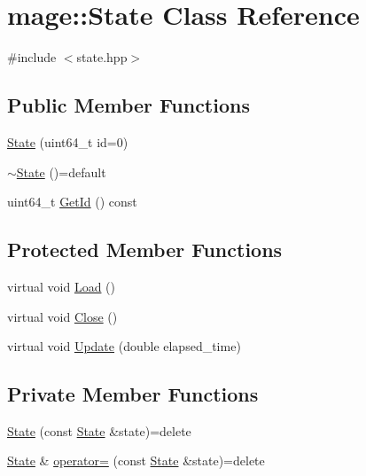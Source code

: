 \hypertarget{classmage_1_1_state}{}\section{mage\+:\+:State Class Reference}
\label{classmage_1_1_state}


{\ttfamily \#include $<$state.\+hpp$>$}

\subsection*{Public Member Functions}
\begin{DoxyCompactItemize}
\item 
\hyperlink{classmage_1_1_state_ac21bb6de22bb3b9c1b18d98b53e92100}{State} (uint64\+\_\+t id=0)
\item 
\hyperlink{classmage_1_1_state_a84d2fed20df97a3718ab4a554b677e52}{$\sim$\+State} ()=default
\item 
uint64\+\_\+t \hyperlink{classmage_1_1_state_a07c383a809204ba12a2bbfb22d2977d5}{Get\+Id} () const
\end{DoxyCompactItemize}
\subsection*{Protected Member Functions}
\begin{DoxyCompactItemize}
\item 
virtual void \hyperlink{classmage_1_1_state_aa88ace504c82ad372e5e599746f3ebda}{Load} ()
\item 
virtual void \hyperlink{classmage_1_1_state_a1edd5d756566f5b689c7a381f4e6b301}{Close} ()
\item 
virtual void \hyperlink{classmage_1_1_state_afbee8caa84e0c69ac5757f7e5e87317f}{Update} (double elapsed\+\_\+time)
\end{DoxyCompactItemize}
\subsection*{Private Member Functions}
\begin{DoxyCompactItemize}
\item 
\hyperlink{classmage_1_1_state_a4515dcef9830ce6522ea6036465dcff7}{State} (const \hyperlink{classmage_1_1_state}{State} \&state)=delete
\item 
\hyperlink{classmage_1_1_state}{State} \& \hyperlink{classmage_1_1_state_a84466f5058f3e27b85a3b164e551008c}{operator=} (const \hyperlink{classmage_1_1_state}{State} \&state)=delete
\end{DoxyCompactItemize}

